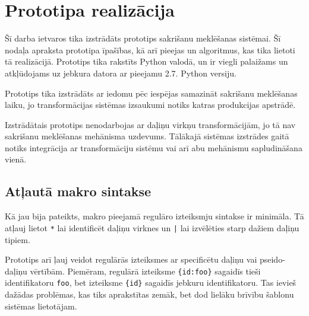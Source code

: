 \section{\label{s:prototype}Prototipa realizācija}

Šī darba ietvaros tika izstrādāts prototips sakrišanu meklēšanas sistēmai. Šī nodaļa apraksta prototipa īpašības, kā arī pieejas un algoritmus, kas tika lietoti tā realizācijā. Prototips tika rakstīts Python valodā, un ir viegli palaižams un atkļūdojams uz jebkura datora ar pieejamu 2.7. Python versiju.

Prototips tika izstrādāts ar iedomu pēc iespējas samazināt sakrišanu meklēšanas laiku, jo transformācijas sistēmas izsaukumi notiks katras produkcijas apstrādē.

Izstrādātais prototips nenodarbojas ar daļiņu virkņu transformācijām, jo tā nav sakrišanu meklēšanas mehānisma uzdevums. Tālākajā sistēmas izstrādes gaitā notiks integrācija ar transformāciju sistēmu vai arī abu mehānismu sapludināšana vienā.


\subsection{\label{sbs:prot_syntax}Atļautā makro sintakse}

Kā jau bija pateikts, makro pieejamā regulāro izteiksmju sintakse ir minimāla. Tā atļauj lietot \verb|*| lai identificēt daļiņu virknes un \verb/|/ lai izvēlēties starp dažiem daļiņu tipiem.

Prototips arī ļauj veidot regulārās izteiksmes ar specificētu daļiņu vai pseido-daļiņu vērtībām. Piemēram, regulārā izteiksme \verb|{id:foo}| sagaidīs tieši identifikatoru \verb|foo|, bet izteiksme \verb|{id}| sagaidīs jebkuru identifikatoru. Tas ievieš dažādas problēmas, kas tiks aprakstītas zemāk, bet dod lielāku brīvību šablonu sistēmas lietotājam.

